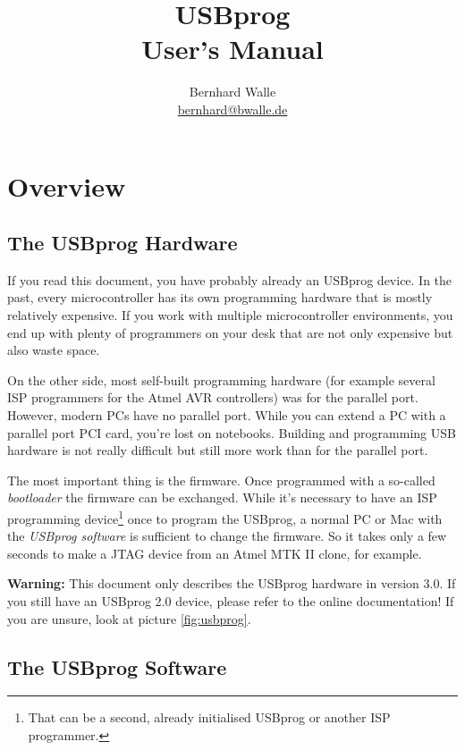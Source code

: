 \documentclass[bibtotoc,UKenglish,halfparskip,oneside,DIV12]{scrreprt}
\begin{document}
\title{USBprog \\ User's Manual}
\author{Bernhard Walle\\ \url{bernhard@bwalle.de}}
\maketitle
\tableofcontents

\chapter{Overview}

\section{The USBprog Hardware}

If you read this document, you have probably already an USBprog device. In the past, every
microcontroller has its own programming hardware that is mostly relatively expensive. If you work
with multiple microcontroller environments, you end up with plenty of programmers on your desk that
are not only expensive but also waste space.

On the other side, most self-built programming hardware (for example several ISP programmers for the
Atmel AVR controllers) was for the parallel port. However, modern PCs have no parallel port. While
you can extend a PC with a parallel port PCI card, you're lost on notebooks. Building and
programming USB hardware is not really difficult but still more work than for the parallel port.

The most important thing is the firmware. Once programmed with a so-called \emph{bootloader} the
firmware can be exchanged. While it's necessary to have an ISP programming device\footnote{That can
be a second, already initialised USBprog or another ISP programmer.} once to program the USBprog, a
normal PC or Mac with the \emph{USBprog software} is sufficient to change the firmware. So it takes
only a few seconds to make a JTAG device from an Atmel MTK II clone, for example.

\textbf{Warning:} This document only describes the USBprog hardware in version 3.0. If you still
have an USBprog 2.0 device, please refer to the online documentation! If you are unsure, look at
picture \vref{fig:usbprog}.

\section{The USBprog Software}
\end{document}
